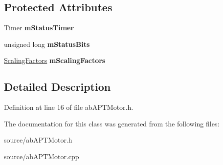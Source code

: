 \subsection*{Protected Attributes}
\begin{DoxyCompactItemize}
\item 
Timer {\bfseries m\+Status\+Timer}\hypertarget{class_a_p_t_motor_aab58a6e523dc74f486fd1c45869dad33}{}\label{class_a_p_t_motor_aab58a6e523dc74f486fd1c45869dad33}

\item 
unsigned long {\bfseries m\+Status\+Bits}\hypertarget{class_a_p_t_motor_ad3f322af6da98d4193f0c0b3f1b55471}{}\label{class_a_p_t_motor_ad3f322af6da98d4193f0c0b3f1b55471}

\item 
\hyperlink{struct_scaling_factors}{Scaling\+Factors} {\bfseries m\+Scaling\+Factors}\hypertarget{class_a_p_t_motor_ac7dc5734487a985f1522b57ffd2da8f8}{}\label{class_a_p_t_motor_ac7dc5734487a985f1522b57ffd2da8f8}

\end{DoxyCompactItemize}


\subsection{Detailed Description}


Definition at line 16 of file ab\+A\+P\+T\+Motor.\+h.



The documentation for this class was generated from the following files\+:\begin{DoxyCompactItemize}
\item 
source/ab\+A\+P\+T\+Motor.\+h\item 
source/ab\+A\+P\+T\+Motor.\+cpp\end{DoxyCompactItemize}
